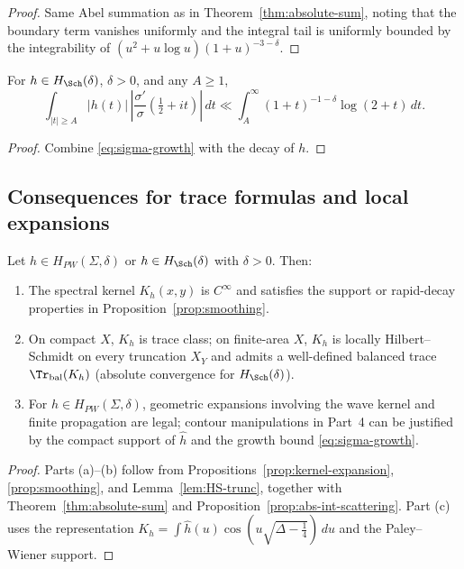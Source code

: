\begin{proof}
Same Abel summation as in Theorem~\ref{thm:absolute-sum}, noting that the boundary term vanishes uniformly and the integral tail is uniformly bounded by the integrability of $(u^2+u\log u)(1+u)^{-3-\delta}$.
\end{proof}

\begin{lemma}
\label{lem:uniform-scatter}
For $h\in H_{\Sch}(\delta)$, $\delta>0$, and any $A\ge1$,
\[
  \int_{|t|\ge A} |h(t)|\,\left|\frac{\sigma'}{\sigma}\!\left(\tfrac12+it\right)\right|\,dt
  \ll \int_{A}^{\infty} (1+t)^{-1-\delta}\log(2+t)\,dt.
\]
\end{lemma}

\begin{proof}
Combine \eqref{eq:sigma-growth} with the decay of $h$.
\end{proof}

\subsection{Consequences for trace formulas and local expansions}
\label{subsec:consequences}

\begin{proposition}
\label{prop:legitimacy}
Let $h\in H_{PW}(\Sigma,\delta)$ or $h\in H_{\Sch}(\delta)$ with $\delta>0$. Then:
\begin{enumerate}[label=(\alph*)]
  \item The spectral kernel $K_h(x,y)$ is $C^\infty$ and satisfies the support or rapid-decay properties in Proposition~\ref{prop:smoothing}.
  \item On compact $X$, $K_h$ is trace class; on finite-area $X$, $K_h$ is locally Hilbert–Schmidt on every truncation $X_Y$ and admits a well-defined balanced trace $\Tr_{\mathrm{bal}}(K_h)$ (absolute convergence for $H_{\Sch}(\delta)$).
  \item For $h\in H_{PW}(\Sigma,\delta)$, geometric expansions involving the wave kernel and finite propagation are legal; contour manipulations in Part~4 can be justified by the compact support of $\widehat h$ and the growth bound \eqref{eq:sigma-growth}.
\end{enumerate}
\end{proposition}

\begin{proof}
Parts (a)–(b) follow from Propositions~\ref{prop:kernel-expansion}, \ref{prop:smoothing}, and Lemma~\ref{lem:HS-trunc}, together with Theorem~\ref{thm:absolute-sum} and Proposition~\ref{prop:abs-int-scattering}. Part (c) uses the representation $K_h=\int \widehat h(u)\cos(u\sqrt{\Delta-\tfrac14})\,du$ and the Paley–Wiener support.
\end{proof}

